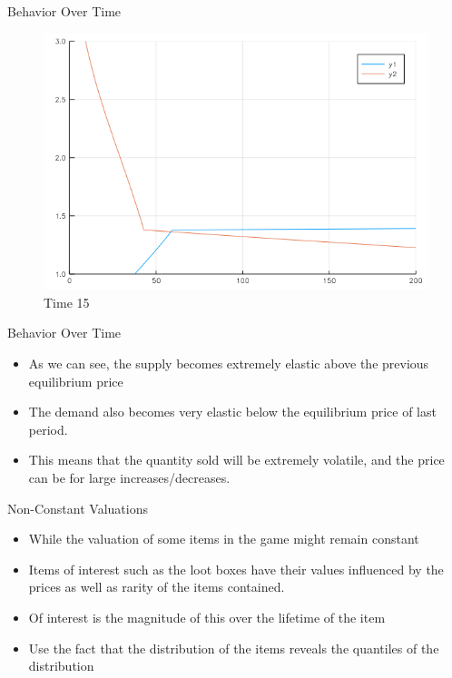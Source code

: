 \documentclass[bigger]{beamer}
\begin{document}
\begin{frame}[label=sec-1-33]{Behavior Over Time}
\begin{figure}[htb]
\centering
\includegraphics[width=.9\linewidth]{../Plots/gif/000015.png}
\caption{Time 15}
\end{figure}
\end{frame}


\begin{frame}[label=sec-1-34]{Behavior Over Time}
\begin{itemize}
\item As we can see, the supply becomes extremely elastic above the
previous equilibrium price
\item The demand also becomes very elastic below the equilibrium price of
last period.
\item This means that the quantity sold will be extremely volatile, and
the price can be for large increases/decreases.
\end{itemize}
\end{frame}



\begin{frame}[label=sec-1-35]{Non-Constant Valuations}
\begin{itemize}
\item While the valuation of some items in the game might remain constant
\item Items of interest such as the loot boxes have their values
influenced by the prices as well as rarity of the items contained.
\item Of interest is the magnitude of this over the lifetime of the item
\item Use the fact that the distribution of the items reveals the
quantiles of the distribution
\end{itemize}
\end{frame}
\end{document}
